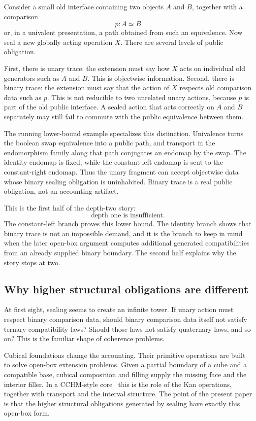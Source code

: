 \documentclass{lmcs}
\begin{document}
Consider a small old interface containing two objects \(A\) and \(B\), together
with a comparison
\[
  p : A \simeq B
\]
or, in a univalent presentation, a path obtained from such an equivalence.  Now
seal a new globally acting operation \(X\).  There are several levels of public
obligation.

First, there is unary trace: the extension must say how \(X\) acts on individual
old generators such as \(A\) and \(B\).  This is objectwise information.  Second,
there is binary trace: the extension must say that the action of \(X\) respects
old comparison data such as \(p\).  This is not reducible to two unrelated unary
actions, because \(p\) is part of the old public interface.  A sealed action that
acts correctly on \(A\) and \(B\) separately may still fail to commute with the
public equivalence between them.

The running lower-bound example specializes this distinction.  Univalence turns
the boolean swap equivalence into a public path, and transport in the endomorphism
family along that path conjugates an endomap by the swap.  The identity endomap
is fixed, while the constant-left endomap is sent to the constant-right endomap.
Thus the unary fragment can accept objectwise data whose binary sealing
obligation is uninhabited.  Binary trace is a real public obligation, not an
accounting artifact.

This is the first half of the depth-two story:
\[
  \text{depth one is insufficient.}
\]
The constant-left branch proves this lower bound.  The identity branch shows
that binary trace is not an impossible demand, and it is the branch to keep in
mind when the later open-box argument computes additional generated
compatibilities from an already supplied binary boundary.  The second half
explains why the story stops at two.

\subsection{Why higher structural obligations are different}

At first sight, sealing seems to create an infinite tower.  If unary action must
respect binary comparison data, should binary comparison data itself not satisfy
ternary compatibility laws?  Should those laws not satisfy quaternary laws, and
so on?  This is the familiar shape of coherence problems.

Cubical foundations change the accounting.  Their primitive operations are built
to solve open-box extension problems.  Given a partial boundary of a cube and a
compatible base, cubical composition and filling supply the missing face and the
interior filler.  In a CCHM-style core~\cite{cubical} this is the role of the
Kan operations, together with transport and the interval structure.  The point
of the present paper is that the higher structural obligations generated by
sealing have exactly this open-box form.
\end{document}
